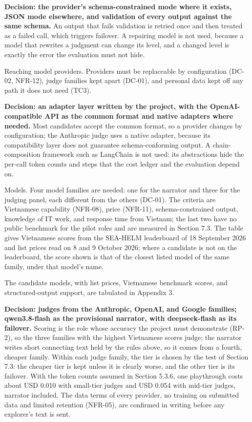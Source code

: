\textbf{Decision: the provider's schema-\allowbreak{}constrained mode where it exists, JSON mode elsewhere, and validation of every output against the same schema.} An output that fails validation is retried once and then treated as a failed call, which triggers failover. A repairing model is not used, because a model that rewrites a judgment can change its level, and a changed level is exactly the error the evaluation must not hide.

Reaching model providers. Providers must be replaceable by configuration (DC-02, NFR-12), judge families kept apart (DC-01), and personal data kept off any path it does not need (TC3).

\textbf{Decision: an adapter layer written by the project, with the OpenAI-\allowbreak{}compatible API as the common format and native adapters where needed.} Most candidates accept the common format, so a provider changes by configuration; the Anthropic judge uses a native adapter, because its compatibility layer does not guarantee schema-\allowbreak{}conforming output. A chain-\allowbreak{}composition framework such as LangChain\cite{r197} is not used: its abstractions hide the per-call token counts and steps that the cost ledger and the evaluation depend on.

Models. Four model families are needed: one for the narrator and three for the judging panel, each different from the others (DC-01). The criteria are Vietnamese capability (NFR-08), price (NFR-11), schema-\allowbreak{}constrained output, knowledge of IT work, and response time from Vietnam; the last two have no public benchmark for the pilot roles and are measured in Section 7.3. The table gives Vietnamese scores from the SEA-HELM leaderboard of 18 September 2026\cite{r132} and list prices read on 8 and 9 October 2026\cite{r133}; where a candidate is not on the leaderboard, the score shown is that of the closest listed model of the same family, under that model's name.

The candidate models, with list prices, Vietnamese benchmark scores, and structured-\allowbreak{}output support, are tabulated in Appendix 3.

\textbf{Decision: judges from the Anthropic, OpenAI, and Google families; qwen3.\allowbreak{}8-\allowbreak{}flash as the provisional narrator, with deepseek-\allowbreak{}flash as its failover.} Scoring is the role whose accuracy the project must demonstrate (RP-2), so the three families with the highest Vietnamese scores judge; the narrator writes short connecting text held by the rules above, so it comes from a fourth, cheaper family. Within each judge family, the tier is chosen by the test of Section 7.3: the cheaper tier is kept unless it is clearly worse, and the other tier is its failover. With the token counts assumed in Section 5.3.6, one playthrough costs about USD 0.010 with small-tier judges and USD 0.054 with mid-tier judges, narrator included. The data terms of every provider, no training on submitted data and limited retention (NFR-05), are confirmed in writing before any explorer's text is sent.

